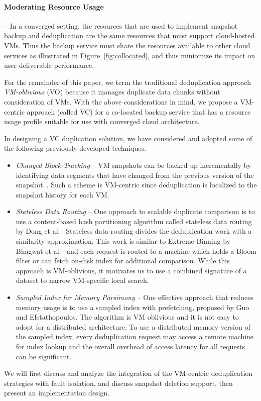\paragraph*{Moderating Resource Usage} --
In a converged setting, the resources that are used to implement snapshot
backup and deduplication are the same resources that must support cloud-hosted
VMs.  Thus the backup service must share the resources available to
other cloud services as illustrated in Figure~\ref{fig:collocated},
and thus miniomize its impact on user-deliverable performance.

For the remainder of this paper, 
we term the traditional deduplication approach {\em VM-oblivious} (VO)
because it manages duplicate data chunks without consideration of VMs.
With the above  considerations in mind, we propose a 
VM-centric approach (called VC)
for a co-located backup service that has a resource usage profile
suitable for use with converged cloud architecture.  

In designing a VC duplication solution, we have considered and adopted some of
the following previously-developed techniques.
\begin{itemize}
\item {\em Changed Block Tracking} --
VM snapshots can be  backed up  incrementally by identifying data segments that have
changed from the previous version of the snapshot~\cite{Clements2009,Vrable2009,TanIPDPS2011}.
Such a scheme  is  VM-centric since deduplication is localized to the snapshot
history for each VM.
\item {\em Stateless  Data Routing} --
One approach to scalable duplicate comparison is to use a content-based hash
partitioning algorithm called stateless data routing by Dong et al.~\cite{Dong2011} 
Stateless data routing divides the deduplication work with a similarity approximation. This work 
is similar to Extreme Binning by Bhagwat et al.~\cite{extreme_binning09} and 
each request is routed  to a machine which holds
a Bloom filter  or can fetch on-disk index for additional comparison.
While this approach is VM-oblivious, it motivates us to  use  a combined signature of a dataset to narrow
VM-specific local search.
\item {\em Sampled Index for Memory Parsimony} -- 
One effective approach that reduces memory usage is 
to use a sampled index with prefetching, proposed  by Guo and Efstathopoulos\cite{Guo2011}. 
The algorithm is VM oblivious and it is not easy  to adopt for a distributed architecture. 
To use a distributed memory version of the sampled index, every deduplication request
may access a remote machine for index lookup and the overall overhead of access latency for all requests
can be significant.  
\end{itemize}

We will first discuss and analyze the integration of the VM-centric deduplication strategies with fault isolation, 
and discuss snapshot deletion support, then present an implementation design. 
